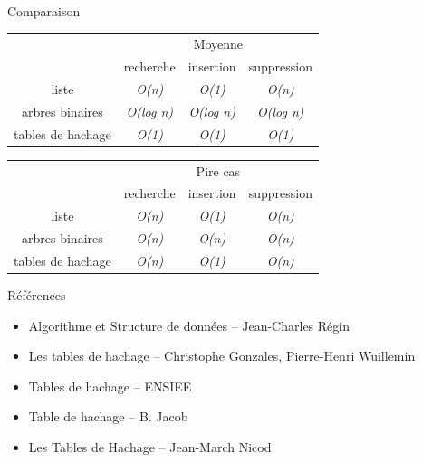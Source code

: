 \documentclass{beamer}
\begin{document}
  \begin{frame}{Comparaison}
    \begin{table}[]
\centering
\begin{tabular}{cccc}
\multicolumn{1}{l}{}                   & \multicolumn{3}{c}{Moyenne}                                                                     \\
\multicolumn{1}{l|}{}                  & \multicolumn{1}{l}{recherche} & \multicolumn{1}{l}{insertion} & \multicolumn{1}{l}{suppression} \\ \hline
\multicolumn{1}{c|}{liste}             & \textit{O(n)}                 & \textit{O(1)}                 & \textit{O(n)}                   \\
\multicolumn{1}{c|}{arbres binaires}   & \textit{O(log n)}             & \textit{O(log n)}             & \textit{O(log n)}               \\
\multicolumn{1}{c|}{tables de hachage} & \textit{O(1)}                 & \textit{O(1)}                 & \textit{O(1)}
\end{tabular}
\end{table}

\begin{table}[]
\centering
\begin{tabular}{cccc}
\multicolumn{1}{l}{}                   & \multicolumn{3}{c}{Pire cas}                                                                    \\
\multicolumn{1}{l|}{}                  & \multicolumn{1}{l}{recherche} & \multicolumn{1}{l}{insertion} & \multicolumn{1}{l}{suppression} \\ \hline
\multicolumn{1}{c|}{liste}             & \textit{O(n)}                 & \textit{O(1)}                 & \textit{O(n)}                   \\
\multicolumn{1}{c|}{arbres binaires}   & \textit{O(n)}                 & \textit{O(n)}                 & \textit{O(n)}                   \\
\multicolumn{1}{c|}{tables de hachage} & \textit{O(n)}                 & \textit{O(1)}                 & \textit{O(n)}
\end{tabular}
\end{table}
  \end{frame}

  \begin{frame}{Références}
    \begin{itemize}
      \item{Algorithme et Structure de données -- Jean-Charles Régin}
      \item{Les tables de hachage -- Christophe Gonzales, Pierre-Henri Wuillemin}
      \item{Tables de hachage -- ENSIEE}
      \item{Table de hachage -- B. Jacob}
      \item{Les Tables de Hachage -- Jean-March Nicod}
    \end{itemize}
  \end{frame}
\end{document}
